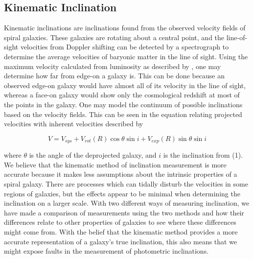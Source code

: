 \documentclass{emulateapj}
\begin{document}
\subsection{Kinematic Inclination}

Kinematic inclinations are inclinations found from the observed velocity fields of spiral galaxies. These galaxies are rotating about a central point, and the line-of-sight velocities from Doppler shifting can be detected by a spectrograph to determine the average velocities of baryonic matter in the line of sight. Using the maximum velocity calculated from luminosity as described by \citet{tullyfish}, one may determine how far from edge-on a galaxy is. This can be done because an observed edge-on galaxy would have almost all of its velocity in the line of sight, whereas a face-on galaxy would show only the cosmological redshift at most of the points in the galaxy. One may model the continuum of possible inclinations based on the velocity fields. This can be seen in the equation relating projected velocities with inherent velocities described by \citet{teuben}

\begin{equation}
V = V_{sys}+V_{rot}(R)\cos{\theta}\sin{i} + V_{exp}(R)\sin{\theta}\sin{i}
\end{equation}

\noindent where $\theta$ is the angle of the deprojected galaxy, and $i$ is the inclination from (1). We believe that the kinematic method of inclination measurement is more accurate because it makes less assumptions about the intrinsic properties of a spiral galaxy. There are processes which can tidally disturb the velocities in some regions of galaxies, but the effects appear to be minimal when determining the inclination on a larger scale. With two different ways of measuring inclination, we have made a comparison of measurements using the two methods and how their differences relate to other properties of galaxies to see where these differences might come from. With the belief that the kinematic method provides a more accurate representation of a galaxy's true inclination, this also means that we might expose faults in the measurement of photometric inclinations. 


\end{document}
